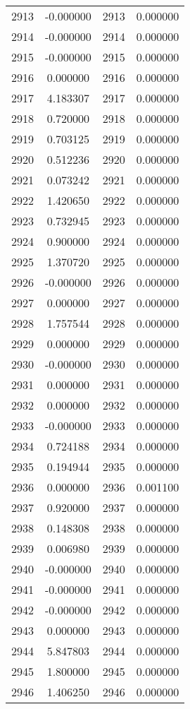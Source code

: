 \documentclass[12pt]{article}
\begin{document}
\begin{longtable}{@{}cccc@{}}
2913 & -0.000000 & 2913 & 0.000000 \\
2914 & -0.000000 & 2914 & 0.000000 \\
2915 & -0.000000 & 2915 & 0.000000 \\
2916 & 0.000000 & 2916 & 0.000000 \\
2917 & 4.183307 & 2917 & 0.000000 \\
2918 & 0.720000 & 2918 & 0.000000 \\
2919 & 0.703125 & 2919 & 0.000000 \\
2920 & 0.512236 & 2920 & 0.000000 \\
2921 & 0.073242 & 2921 & 0.000000 \\
2922 & 1.420650 & 2922 & 0.000000 \\
2923 & 0.732945 & 2923 & 0.000000 \\
2924 & 0.900000 & 2924 & 0.000000 \\
2925 & 1.370720 & 2925 & 0.000000 \\
2926 & -0.000000 & 2926 & 0.000000 \\
2927 & 0.000000 & 2927 & 0.000000 \\
2928 & 1.757544 & 2928 & 0.000000 \\
2929 & 0.000000 & 2929 & 0.000000 \\
2930 & -0.000000 & 2930 & 0.000000 \\
2931 & 0.000000 & 2931 & 0.000000 \\
2932 & 0.000000 & 2932 & 0.000000 \\
2933 & -0.000000 & 2933 & 0.000000 \\
2934 & 0.724188 & 2934 & 0.000000 \\
2935 & 0.194944 & 2935 & 0.000000 \\
2936 & 0.000000 & 2936 & 0.001100 \\
2937 & 0.920000 & 2937 & 0.000000 \\
2938 & 0.148308 & 2938 & 0.000000 \\
2939 & 0.006980 & 2939 & 0.000000 \\
2940 & -0.000000 & 2940 & 0.000000 \\
2941 & -0.000000 & 2941 & 0.000000 \\
2942 & -0.000000 & 2942 & 0.000000 \\
2943 & 0.000000 & 2943 & 0.000000 \\
2944 & 5.847803 & 2944 & 0.000000 \\
2945 & 1.800000 & 2945 & 0.000000 \\
2946 & 1.406250 & 2946 & 0.000000 \\

\end{longtable}
\end{document}
